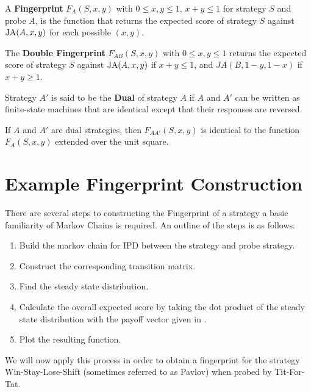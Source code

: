 \begin{definition}\label{def:fingerprint}
A \textbf{Fingerprint} $F_A(S, x, y)$ with $0 \leq x, y \leq 1$, $x+y \leq 1$ for strategy $S$ and probe $A$, is the function that returns the expected score of strategy $S$ against $\text{JA}(A, x, y)$ for each possible $(x, y)$.
\end{definition}



\begin{definition}\label{def:double-fingerprint}
The \textbf{Double Fingerprint} $F_{AB}(S, x, y)$ with $0 \leq x, y \leq 1$ returns the expected score of strategy $S$ against $\text{JA}(A, x, y)$ if $x+y \leq 1$, and $JA(B, 1-y, 1-x)$ if $x+y \geq 1$.
\end{definition}

\begin{definition}\label{def:dual}
Strategy $A'$ is said to be the \textbf{Dual} of strategy $A$ if $A$ and $A'$ can be written as finite-state machines that are identical except that their responses are reversed.
\end{definition}

\begin{theorem}\label{thm:fingerprint-unit-square}
If $A$ and $A'$ are dual strategies, then $F_{AA'}(S, x, y)$ is identical to the function $F_A(S, x, y)$ extended over the unit square.
\end{theorem}


\section{Example Fingerprint Construction}

There are several steps to constructing the Fingerprint of a strategy a basic familiarity of Markov Chains is required.
An outline of the steps is as follows:

\begin{enumerate}
    \item Build the markov chain for IPD between the strategy and probe strategy.
    \item Construct the corresponding transition matrix.
    \item Find the steady state distribution.
    \item Calculate the overall expected score by taking the dot product of the steady state distribution with the payoff vector given in .
    \item Plot the resulting function.
\end{enumerate}
{}
We will now apply this process in order to obtain a fingerprint for the strategy Win-Stay-Lose-Shift (sometimes referred to as Pavlov) when probed by Tit-For-Tat.

